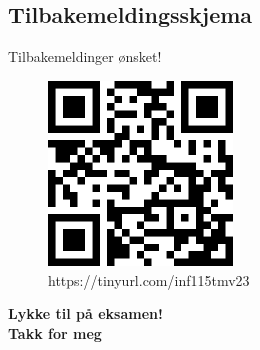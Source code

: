 








\subsection*{Tilbakemeldingsskjema}
\begin{frame}{Tilbakemeldinger ønsket!}
    \begin{figure}
        \centering
        \includegraphics[height = 4.9cm]{images/qrtilbakemelding.png}
        \caption{https://tinyurl.com/inf115tmv23}
        \label{fig:qrcodetilbakemelding}
    \end{figure}
\end{frame}

\begin{frame}
\begin{center}
\begin{Large}
\textbf{Lykke til på eksamen!\\[5mm]
Takk for meg}
\end{Large}
\end{center}  
\end{frame}
